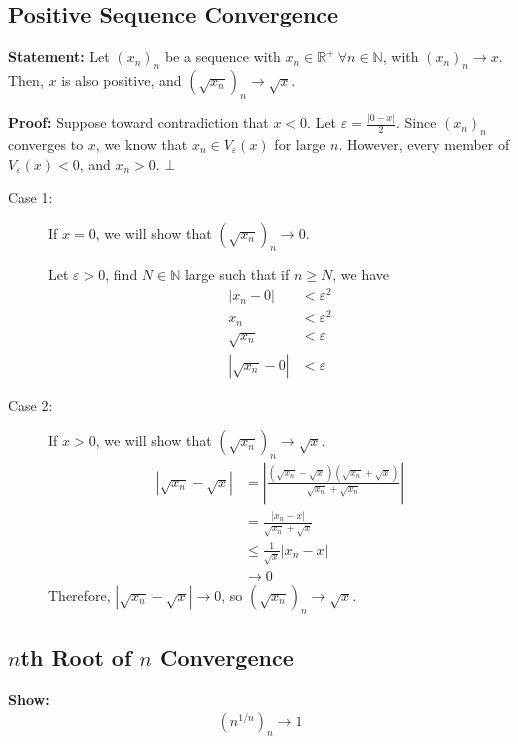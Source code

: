 \documentclass[10pt]{extarticle}
\newcommand{\N}{\mathbb{N}}
\newcommand{\R}{\mathbb{R}}
\begin{document}
  \subsection{Positive Sequence Convergence}%
  \textbf{Statement:} Let $(x_n)_n$ be a sequence with $x_n\in\R^+~\forall n\in\N$, with $(x_n)_n \rightarrow x$. Then, $x$ is also positive, and $\left(\sqrt{x_n}\right)_n \rightarrow \sqrt{x}$.

  \textbf{Proof:} Suppose toward contradiction that $x < 0$. Let $\varepsilon = \frac{|0-x|}{2}$. Since $(x_n)_n$ converges to $x$, we know that $x_n\in V_{\varepsilon}(x)$ for large $n$. However, every member of $V_{\varepsilon}(x) < 0$, and $x_n > 0$. $\bot$
    \begin{description}
      \item[Case 1:] If $x = 0$, we will show that $\left(\sqrt{x_n}\right)_n \rightarrow 0$.\newline

        Let $\varepsilon > 0$, find $N\in\N$ large such that if $n\geq N$, we have
        \begin{align*}
          |x_n - 0| &< \varepsilon^2\\
          x_n &< \varepsilon^2\\
          \sqrt{x_n} &< \varepsilon\\
          |\sqrt{x_n} - 0| &< \varepsilon
        \end{align*}
      \item[Case 2:] If $x > 0$, we will show that $\left(\sqrt{x_n}\right)_n \rightarrow \sqrt{x}$.
        \begin{align*}
          \left|\sqrt{x_n} - \sqrt{x}\right| &= \left|\frac{\left(\sqrt{x_n} - \sqrt{x}\right)\left(\sqrt{x_n} + \sqrt{x}\right)}{\sqrt{x_n} + \sqrt{x_n}}\right|\\
                                             &= \frac{|x_n-x|}{\sqrt{x_n} + \sqrt{x}}\\
                                             &\leq \frac{1}{\sqrt{x}} |x_n - x|\\
                                             &\rightarrow 0
        \end{align*}
        Therefore, $|\sqrt{x_n}-\sqrt{x}| \rightarrow 0$, so $\left(\sqrt{x_n}\right)_n \rightarrow \sqrt{x}$.
    \end{description}
  \subsection{$n$th Root of $n$ Convergence}%
    \textbf{Show:}
      \begin{align*}
        \left(n^{1/n}\right)_n \rightarrow 1
      \end{align*}
\end{document}
